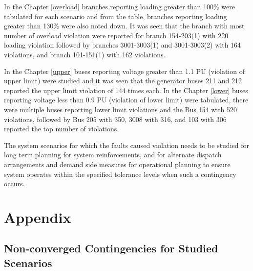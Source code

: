 \documentclass[10pt]{report}
\begin{document}
In the Chapter \ref{overload} branches reporting loading greater than 100\% were tabulated for each scenario and from the table, branches reporting loading greater than 130\% were also noted down. It was seen that the branch with most number of overload violation were reported for branch 154-203(1) with 220 loading violation followed by branches 3001-3003(1) and 3001-3003(2) with 164 violations, and branch 101-151(1) with 162 violations.

In the Chapter \ref{upper} buses reporting voltage greater than 1.1 PU (violation of upper limit) were studied and it was seen that the generator buses 211 and 212 reported the upper limit violation of 144 times each. In the Chapter \ref{lower} buses reporting voltage less than 0.9 PU (violation of lower limit) were tabulated, there were multiple buses reporting lower limit violations and the Bus 154 with 520 violations, followed by Bus 205 with 350, 3008 with 316, and 103 with 306 reported the top number of violations.

The system scenarios for which the faults caused violation needs to be studied for long term planning for system reinforcements, and for alternate dispatch arrangements and demand side measures for operational planning to ensure system operates within the specified tolerance levels when such a contingency occurs. 



\chapter*{Appendix}
\label{chapter:app}

\section{Non-converged Contingencies for Studied Scenarios}
\end{document}
